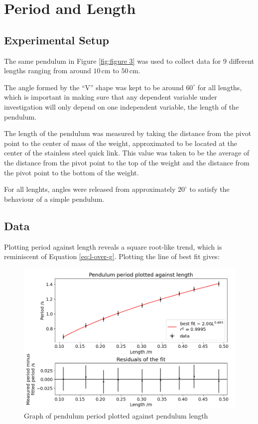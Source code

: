 \documentclass[12pt]{article}
\begin{document}
{\color{blue}

\section{Period and Length} \label{Period and Length}

\subsection{Experimental Setup}
The same pendulum in Figure \ref{fig:figure 3} was used to collect data for 9 different lengths ranging from around $10\,$cm to $50\,$cm.

The angle formed by the ``V'' shape was kept to be around $60^\circ$ for all lengths, which is important in making sure that any dependent variable under investigation will only depend on one independent variable, the length of the pendulum.

The length of the pendulum was measured by taking the distance from the pivot point to the center of mass of the weight, approximated to be located at the center of the stainless steel quick link. This value was taken to be the average of the distance from the pivot point to the top of the weight and the distance from the pivot point to the bottom of the weight.

For all lenghts, angles were released from approximately $20^\circ$ to satisfy the behaviour of a simple pendulum.

\newpage

\subsection{Data}
Plotting period against length reveals a square root-like trend, which is reminiscent of Equation \ref{eq:l-over-g}. Plotting the line of best fit gives:

\begin{figure}[!hptb]
    \centering
    \includegraphics[width=\textwidth]{../figures/period_vs_length.png}
    \caption{\centering Graph of pendulum period plotted against pendulum length}
    \label{fig:figure 6}
\end{figure}

}
\end{document}

